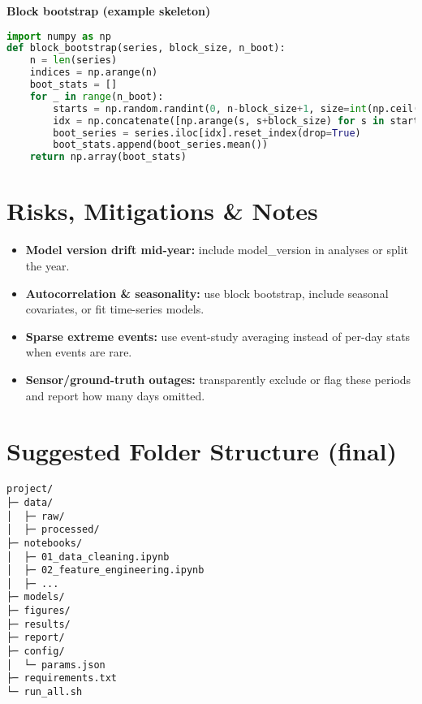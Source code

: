 \documentclass[11pt,a4paper]{article}
\begin{document}
\begin{codebox}
\textbf{Block bootstrap (example skeleton)}
\begin{lstlisting}[language=Python]
import numpy as np
def block_bootstrap(series, block_size, n_boot):
    n = len(series)
    indices = np.arange(n)
    boot_stats = []
    for _ in range(n_boot):
        starts = np.random.randint(0, n-block_size+1, size=int(np.ceil(n/block_size)))
        idx = np.concatenate([np.arange(s, s+block_size) for s in starts])[:n]
        boot_series = series.iloc[idx].reset_index(drop=True)
        boot_stats.append(boot_series.mean())
    return np.array(boot_stats)
\end{lstlisting}
\end{codebox}

\section{Risks, Mitigations \& Notes}

\begin{itemize}
    \item \textbf{Model version drift mid-year:} include model\_version in analyses or split the year.
    \item \textbf{Autocorrelation \& seasonality:} use block bootstrap, include seasonal covariates, or fit time-series models.
    \item \textbf{Sparse extreme events:} use event-study averaging instead of per-day stats when events are rare.
    \item \textbf{Sensor/ground-truth outages:} transparently exclude or flag these periods and report how many days omitted.
\end{itemize}

\section{Suggested Folder Structure (final)}

\begin{verbatim}
project/
├─ data/
│  ├─ raw/
│  ├─ processed/
├─ notebooks/
│  ├─ 01_data_cleaning.ipynb
│  ├─ 02_feature_engineering.ipynb
│  ├─ ...
├─ models/
├─ figures/
├─ results/
├─ report/
├─ config/
│  └─ params.json
├─ requirements.txt
└─ run_all.sh
\end{verbatim}
\end{document}
